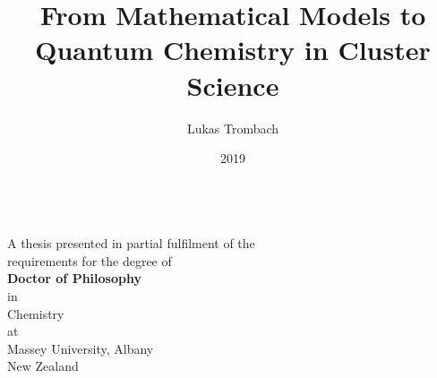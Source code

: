 
\author{Lukas Trombach}
\title{From Mathematical Models to Quantum Chemistry in Cluster Science}
\date{2019}

\makeatletter
\begin{titlepage}
\begin{center}
\vspace*{10mm}
    \LARGE{\textbf{\@title
    }}\\\vspace{2cm}
    \large{
    A thesis presented in partial fulfilment of the \\ requirements for the degree of 
    }\\\vspace{2cm}
    \large{\textbf{
    Doctor of Philosophy
    }}\\
	\large{in \\ Chemistry}\\\vspace{2cm}
    \large{at \\ Massey University, Albany \\ New Zealand}\\\vspace{2cm}
    \large{\textbf{\@author}}\\\vspace{1.5cm}
    \large{\@date}
    
\end{center}
\end{titlepage}
